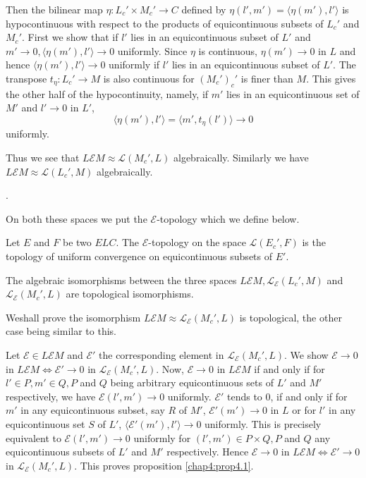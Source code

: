 \noindent Then the bilinear map $\eta :L_c'\times M_c' \to C$ defined
by $\eta(l', m')=\langle\eta(m'), l'\rangle$ is hypocontinuous with
respect to the products of equicontinuous subsets of $L_c'$ and
$M_c'$. First we show that if $l'$ lies in an equicontinuous subset of
$L'$ and $m' \to 0, \langle \eta(m'), l'\rangle \to 0$
uniformly. Since $\eta$ is continuous, $\eta(m') \to 0$ in $L$ and
hence $\langle \eta(m'), l'\rangle \to 0$ uniformly if $l'$ lies in an
equicontinuous subset of $L'$. The transpose $t_\eta:L_c' \to M$ is
also continuous for $(M_c')_c'$ is finer than $M$. This gives the
other half of the hypocontinuity, namely, if $m'$ lies in an
equicontinuous set of $M'$ and $l' \to 0$ in $L'$,
$$
\langle \eta (m'), l'\rangle = \langle m', t_\eta(l')\rangle \to 0
$$
uniformly.

Thus we see that $L \mathcal{E} M \approx \mathscr{L}(M_c', L)$
algebraically. Similarly we have $L \mathcal{E} M \approx
\mathscr{L}(L_c', M)$ algebraically.

.

On both these spaces we put the $\mathcal{E}$-topology which we define
below.

\begin{definition}\label{chap4:def4.2}
Let $E$ and $F$ be two $ELC$. The $\mathcal{E}$-topology on the space
$\mathscr{L}(E_c', F)$ is the topology of uniform convergence on
equicontinuous subsets of $E'$.
\end{definition}

\setcounter{section}{4}
\setcounter{prop}{0}
\begin{prop}\label{chap4:prop4.1}
The algebraic isomorphisms between the three spaces $L \mathcal{E} M,
\mathscr{L}_\mathcal{E}(L_c', M)$ and $\mathscr{L}_\mathcal{E}(M_c',
L)$ are topological isomorphisms.

We\pageoriginale shall prove the isomorphism $L \mathcal{E} M \approx
\mathscr{L}_\mathcal{E} (M_c', L)$ is topological, the other case
being similar to this.

Let $\mathscr{E} \in L \mathcal{E} M$ and $\mathscr{E}'$ the
corresponding element in $\mathscr{L}_\mathcal{E}(M_c', L)$. We show
$\mathscr{E} \to 0$ in $L \mathcal{E} M \Longleftrightarrow \mathscr{E}'
\to 0$ in $\mathscr{L}_\mathcal{E}(M_c', L)$. Now, $\mathscr{E} \to 0$
in $L \mathcal{E} M$ if and only if for $l' \in P, m' \in Q, P$ and
$Q$ being arbitrary equicontinuous sets of $L'$ and $M'$ respectively,
we have $\mathscr{E}(l', m') \to 0$ uniformly. $\mathscr{E}'$ tends to
$0$, if and only if for $m'$ in any equicontinuous subset, say $R$ of
$M'$, $\mathscr{E}'(m') \to 0$ in $L$ or for $l'$ in any
equicontinuous set $S$ of $L'$, $\langle \mathscr{E}'(m'), l'\rangle
\to 0$ uniformly. This is precisely equivalent to $\mathscr{E}(l', m')
\to 0$ uniformly for $(l', m') \in P \times Q, P$ and $Q$ any
equicontinuous subsets of $L'$ and $M'$ respectively. Hence
$\mathscr{E} \to 0$ in $L \mathcal{E} M \Longleftrightarrow
\mathscr{E}'\to 0$ in $\mathscr{L}_\mathcal{E} (M_c', L)$. This
proves proposition \ref{chap4:prop4.1}.   
\end{prop}

